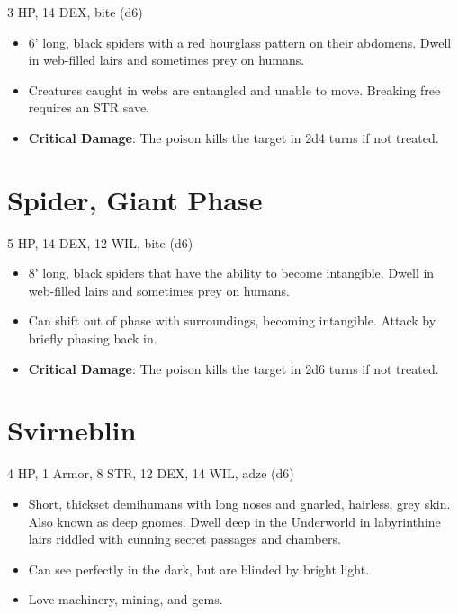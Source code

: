 \documentclass[
  10pt,
  american,
]{article}
\begin{document}
3 HP, 14 DEX, bite (d6)

\begin{samepage}
\begin{itemize}
\setlength\itemsep{-.5em}
\item 6’ long, black spiders with a red hourglass pattern on their abdomens. Dwell in web-filled lairs and sometimes prey on humans.
\item Creatures caught in webs are entangled and unable to move. Breaking free requires an STR save.
\item \textbf{Critical Damage}: The poison kills the target in 2d4 turns if not treated.
\end{itemize}
\end{samepage}

\hypertarget{spider-giant-phase}{%
\section{Spider, Giant Phase}\label{spider-giant-phase}}

5 HP, 14 DEX, 12 WIL, bite (d6)

\begin{samepage}
\begin{itemize}
\setlength\itemsep{-.5em}
\item 8’ long, black spiders that have the ability to become intangible. Dwell in web-filled lairs and sometimes prey on humans.
\item Can shift out of phase with surroundings, becoming intangible. Attack by briefly phasing back in.
\item \textbf{Critical Damage}: The poison kills the target in 2d6 turns if not treated.
\end{itemize}
\end{samepage}

\hypertarget{svirneblin}{%
\section{Svirneblin}\label{svirneblin}}

4 HP, 1 Armor, 8 STR, 12 DEX, 14 WIL, adze (d6)

\begin{samepage}
\begin{itemize}
\setlength\itemsep{-.5em}
\item Short, thickset demihumans with long noses and gnarled, hairless, grey skin. Also known as deep gnomes. Dwell deep in the Underworld in labyrinthine lairs riddled with cunning secret passages and chambers.
\item Can see perfectly in the dark, but are blinded by bright light.
\item Love machinery, mining, and gems.
\end{itemize}
\end{samepage}
\end{document}
